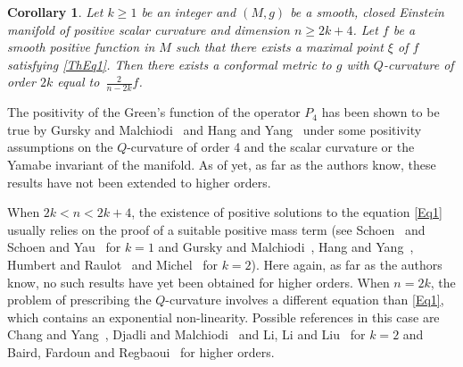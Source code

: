 \documentclass[reqno]{amsart}
\numberwithin{equation}{section}
\newcommand{\<}{\left<}
\renewcommand{\>}{\right>}
\renewcommand{\[}{\left[}
\renewcommand{\]}{\right]}
\renewcommand{\(}{\left(}
\renewcommand{\)}{\right)}
\newtheorem{corollary}{Corollary}[section]
\begin{document}
\begin{corollary}
Let $k\ge1$ be an integer and $\(M,g\)$ be a smooth, closed Einstein manifold of positive scalar curvature and dimension $n\ge 2k+4$. Let $f$ be a smooth positive function in $M$ such that there exists a maximal point $\xi$ of $f$ satisfying \eqref{ThEq1}. Then there exists a conformal metric to $g$ with $Q$-curvature of order $2k$ equal to~$\frac{2}{n-2k}f$.
\end{corollary}

The positivity of the Green's function of the operator $P_4$ has been shown to be true by  Gursky and Malchiodi~\cites{GurMal} and Hang and Yang~\cites{HangYang1,HangYang2} under some positivity assumptions on the $Q$-curvature of order 4 and the scalar curvature or the Yamabe invariant of the manifold. As of yet, as far as the authors know, these results have not been extended to higher orders.

\smallskip
When $2k<n<2k+4$, the existence of positive solutions to the equation \eqref{Eq1} usually relies on the proof of a suitable positive mass term (see Schoen~\cite{Sch1} and Schoen and Yau~\cite{SchYau} for $k=1$ and Gursky and Malchiodi~\cites{GurMal}, Hang and Yang~\cite{HangYang1}, Humbert and Raulot~\cite{HumRau} and Michel~\cite{Mic} for $k=2$). Here again, as far as the authors know, no such results have yet been obtained for higher orders. When $n=2k$, the problem of prescribing the $Q$-curvature involves a different equation than \eqref{Eq1}, which contains an exponential non-linearity. Possible references in this case are Chang and Yang~\cite{ChangYang}, Djadli and Malchiodi~\cite{DjaMal} and Li, Li and Liu~\cite{LiLiLiu} for $k=2$ and Baird, Fardoun and Regbaoui~\cite{BaiFarReg} for higher orders.  
\end{document}
